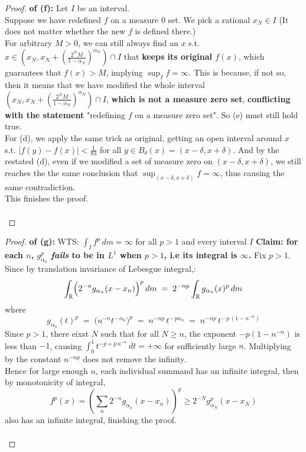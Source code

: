 \documentclass[lang=cn,11pt]{elegantbook}
\begin{document}
\begin{proof}
\textbf{of (f):} 
Let $I$ be an interval.\\
Suppose we have redefined $f$ on a measure $0$ set. We pick a rational $x_N \in I$ (It does not matter whether the new $f$ is defined there.)\\
For arbitrary $M>0$, we can still always find an $x$ s.t. $x \in (x_N, x_N + (\frac{2^N M}{1-\alpha_N})^{\alpha_N}) \cap I$ that \textbf{keeps its original $f(x)$}, which guarantees that $f(x) > M$, implying $\sup_I f = \infty$. This is because, if not so, then it means that we have modified the whole interval $(x_N, x_N + (\frac{2^N M}{1-\alpha_N})^{\alpha_N}) \cap I$, \textbf{which is not a measure zero set}, \textbf{conflicting with the statement} "redefining $f$ on a measure zero set".
So (e) must still hold true.\\
For (d), we apply the same trick as original, getting an open interval around $x$ s.t. $|f(y) - f(x)| < \frac{1}{83}$ for all $y \in B_\delta (x) = (x-\delta, x+ \delta)$. And by the restated (d), even if we modified a set of measure zero on $(x-\delta, x+ \delta)$, we still reaches the the same conclusion that $\sup_{(x-\delta, x+ \delta)} f = \infty$, thus causing the same contradiction.\\
This finishes the proof.\\\\
\end{proof}



\begin{proof}
\textbf{of (g):}
WTS: \(\int_I f^p \, d m = \infty\) for all \(p>1\) and every interval \(I\)
\textbf{Claim: for each $n$,  \(g_{\alpha_n}^p\) \emph{fails} to be in \(L^1\) when \(p>1\), i.e its integral is $\infty$.}
Fix $p>1$.\\
Since by translation invariance of Lebesgue integral,:
\[
  \int_{\mathbb{R}} \Bigl(2^{-n}g_{\alpha_n}(x - x_n)\Bigr)^p \, d m
  \;=\;
  2^{-np}\int_{\mathbb{R}} g_{\alpha_n}(x)^p \, d m
\]
where
\[
  g_{\alpha_n}(t)^p 
  \;=\;
  \bigl(n^{-n}t^{-\,\alpha_n}\bigr)^p
  \;=\;
  n^{-np}\,t^{-\,p\alpha_n}
  \;=\;
  n^{-np}\,t^{-\,p\,(1 - n^{-n})}
\]
Since \(p > 1\), there eixst $N$ such that for all $N\geq n$, the exponent \(-p(1-n^{-n})\) is less than \(-1\), causing \(\int_0^1 t^{-p + p\,n^{-n}}\,dt = +\infty\) for sufficiently large \(n\).  Multiplying by the constant \(n^{-np}\) does not remove the infinity. \\
Hence for large enough $n$, each individual summand has an infinite integral, then by monotonicity of integral, \[
f^p(x) = (\sum_n 2^{-n}g_{\alpha_n}(x - x_n))^p \geq 2^{-N}g^p_{\alpha_N}(x - x_N)
\]also has an infinite integral, finishing the proof.\\\\
\end{proof}
\end{document}

